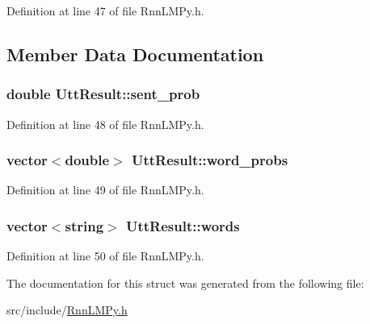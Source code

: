 Definition at line 47 of file Rnn\+L\+M\+Py.\+h.



\subsection{Member Data Documentation}
\subsubsection[{sent\+\_\+prob}]{\setlength{\rightskip}{0pt plus 5cm}double Utt\+Result\+::sent\+\_\+prob}\hypertarget{struct_utt_result_a8ebe9f7f594ed45bbabd3862a29176da}{}\label{struct_utt_result_a8ebe9f7f594ed45bbabd3862a29176da}


Definition at line 48 of file Rnn\+L\+M\+Py.\+h.

\subsubsection[{word\+\_\+probs}]{\setlength{\rightskip}{0pt plus 5cm}vector$<$double$>$ Utt\+Result\+::word\+\_\+probs}\hypertarget{struct_utt_result_a3aaefffa7b4e35e26ae5bdba9a53e61a}{}\label{struct_utt_result_a3aaefffa7b4e35e26ae5bdba9a53e61a}


Definition at line 49 of file Rnn\+L\+M\+Py.\+h.

\subsubsection[{words}]{\setlength{\rightskip}{0pt plus 5cm}vector$<$string$>$ Utt\+Result\+::words}\hypertarget{struct_utt_result_ad181f1ee4ed721f9a553eea801c2f4a8}{}\label{struct_utt_result_ad181f1ee4ed721f9a553eea801c2f4a8}


Definition at line 50 of file Rnn\+L\+M\+Py.\+h.



The documentation for this struct was generated from the following file\+:\begin{DoxyCompactItemize}
\item 
src/include/\hyperlink{_rnn_l_m_py_8h}{Rnn\+L\+M\+Py.\+h}\end{DoxyCompactItemize}
